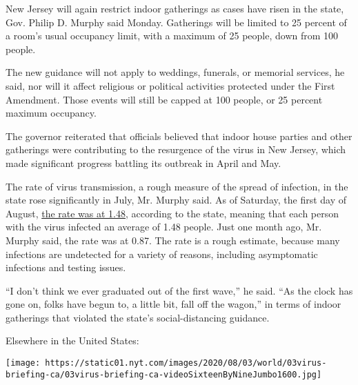 New Jersey will again restrict indoor gatherings as cases have risen in
the state, Gov. Philip D. Murphy said Monday. Gatherings will be limited
to 25 percent of a room's usual occupancy limit, with a maximum of 25
people, down from 100 people.

The new guidance will not apply to weddings, funerals, or memorial
services, he said, nor will it affect religious or political activities
protected under the First Amendment. Those events will still be capped
at 100 people, or 25 percent maximum occupancy.

The governor reiterated that officials believed that indoor house
parties and other gatherings were contributing to the resurgence of the
virus in New Jersey, which made significant progress battling its
outbreak in April and May.

The rate of virus transmission, a rough measure of the spread of
infection, in the state rose significantly in July, Mr. Murphy said. As
of Saturday, the first day of August,
\href{https://twitter.com/GovMurphy/status/1290335172446097409/photo/2}{the
rate was at 1.48}, according to the state, meaning that each person with
the virus infected an average of 1.48 people. Just one month ago, Mr.
Murphy said, the rate was at 0.87. The rate is a rough estimate, because
many infections are undetected for a variety of reasons, including
asymptomatic infections and testing issues.

``I don't think we ever graduated out of the first wave,'' he said. ``As
the clock has gone on, folks have begun to, a little bit, fall off the
wagon,'' in terms of indoor gatherings that violated the state's
social-distancing guidance.

Elsewhere in the United States:

\texttt{[image: https://static01.nyt.com/images/2020/08/03/world/03virus-briefing-ca/03virus-briefing-ca-videoSixteenByNineJumbo1600.jpg]}

